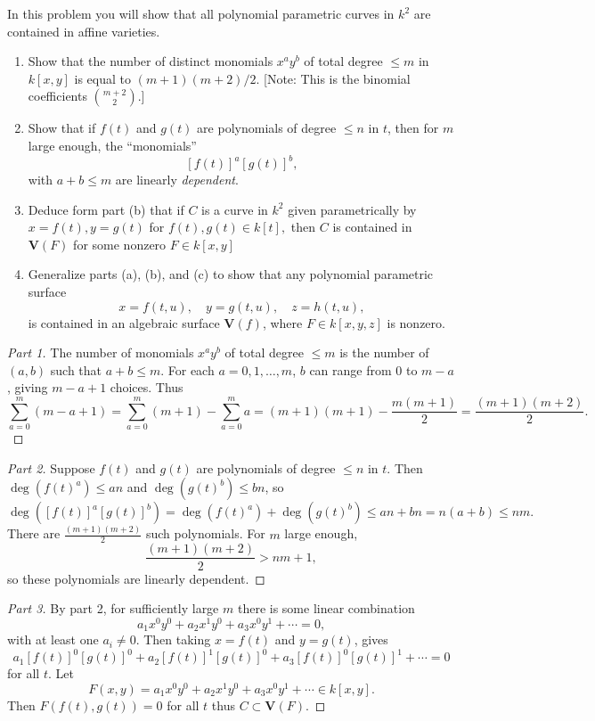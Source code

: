 \begin{tcolorbox}[title=Problem 5, breakable]
    In this problem you will show that all polynomial parametric curves in $k^2$ are contained
    in affine varieties.
    \begin{enumerate}
        \item Show that the number of distinct monomials $x^a y^b$ of total degree $\le m$
        in $k[x, y]$ is equal to $(m + 1)(m + 2) / 2$. [Note: This is the binomial coefficients 
        $\binom{m + 2}{2}$.]
        \item Show that if $f(t)$ and $g(t)$ are polynomials of degree $\le n$ in $t$, then for $m$ large enough,
        the ``monomials''
        \[[f(t)]^a [g(t)]^b,\]
        with $a + b \le m$ are linearly \emph{dependent}.
        \item Deduce form part (b) that if $C$ is a curve in $k^2$ given parametrically by $x = f(t), y = g(t)$
        for $f(t), g(t) \in k[t],$ then $C$ is contained in $\textbf{V}(F)$ for some nonzero $F \in k[x, y]$
        \item Generalize parts (a), (b), and (c) to show that any polynomial parametric surface 
        \[x = f(t, u), \quad y = g(t, u), \quad z = h(t, u),\]
        is contained in an algebraic surface $\textbf{V}(f)$, where $F \in k[x, y, z]$ is nonzero.
    \end{enumerate}
\end{tcolorbox}

\begin{proof}[Part 1]
    The number of monomials $x^a y^b$ of total degree $\le m$ is the number of $(a,b)$ such that $a+b \le m$.
    For each $a = 0, 1, \dots, m$, $b$ can range from $0$ to $m-a$, giving $m-a+1$ choices.
    Thus
    \[
    \sum_{a=0}^{m} (m-a+1) = \sum_{a=0}^{m} (m+1) - \sum_{a=0}^{m} a = (m+1)(m+1) - \frac{m(m+1)}{2} = \frac{(m+1)(m+2)}{2}.
    \]
\end{proof}

\begin{proof}[Part 2]
    Suppose $f(t)$ and $g(t)$ are polynomials of degree $\le n$ in $t$.
    Then $\deg(f(t)^a) \le an$ and $\deg(g(t)^b) \le bn$, so
    \[
    \deg([f(t)]^a [g(t)]^b) = \deg(f(t)^a) + \deg(g(t)^b) \le an + bn = n(a+b) \le nm.
    \]
    There are $\frac{(m+1)(m+2)}{2}$ such polynomials. 
    For $m$ large enough, 
    \[
    \frac{(m+1)(m+2)}{2} > nm+1,
    \]
    so these polynomials are linearly dependent.
\end{proof}

\begin{proof}[Part 3]
    By part 2, for sufficiently large $m$ there is some linear combination
    \[
    a_1 x^0 y^0 + a_2 x^1 y^0 + a_3 x^0 y^1 + \cdots = 0,
    \]
    with at least one $a_i \ne 0$.
    Then taking $x = f(t)$ and $y = g(t)$, gives
    \[
    a_1 [f(t)]^0 [g(t)]^0 + a_2 [f(t)]^1 [g(t)]^0 + a_3 [f(t)]^0 [g(t)]^1 + \cdots = 0
    \]
    for all $t$. Let
    \[
    F(x,y) = a_1 x^0 y^0 + a_2 x^1 y^0 + a_3 x^0 y^1 + \cdots \in k[x,y].
    \]
    Then $F(f(t),g(t)) = 0$ for all $t$ thus $C \subset \textbf{V}(F)$.
\end{proof}


